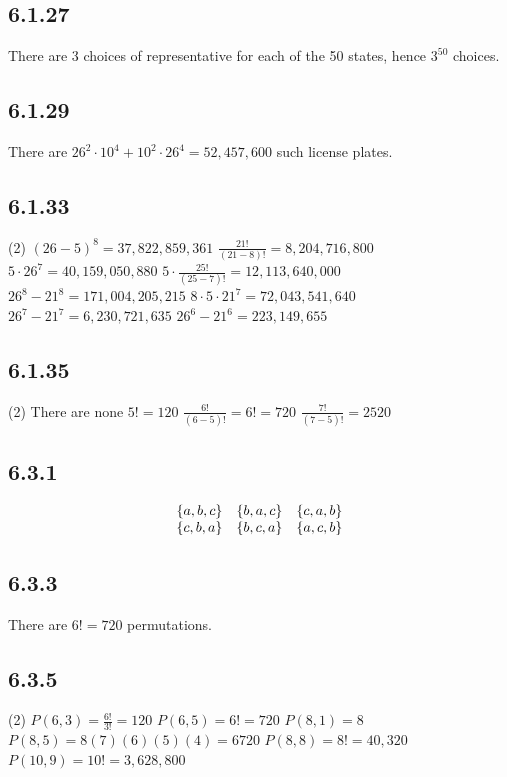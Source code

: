 \documentclass[12pt,titlepage]{extarticle}
\begin{document}
\subsection*{6.1.27}
There are 3 choices of representative for each of the 50 states, hence $3^{50}$ choices.

\subsection*{6.1.29}
There are $26^2 \cdot 10^4 + 10^2 \cdot 26^4 = 52,457,600$ such license plates.

\subsection*{6.1.33}
\begin{tasks}(2)
    \task $(26-5)^8 = 37,822,859,361$
    \task $\frac{21!}{(21-8)!} = 8,204,716,800$
    \task $5 \cdot 26^7 = 40,159,050,880$
    \task $5 \cdot \frac{25!}{(25-7)!} = 12,113,640,000$
    \task $26^8 - 21^8 = 171,004,205,215$
    \task $8 \cdot 5 \cdot 21^7 = 72,043,541,640$
    \task $26^7 - 21^7 = 6,230,721,635$
    \task $26^6 - 21^6 = 223,149,655$
\end{tasks}

\subsection*{6.1.35}
\begin{tasks}(2)
    \task There are none
    \task $5! = 120$
    \task $\frac{6!}{(6-5)!} = 6! = 720$
    \task $\frac{7!}{(7-5)!} = 2520$
\end{tasks}

\subsection*{6.3.1}
\[
    \begin{array}{ccc}
        \qty{a,b,c} & \qty{b,a,c} & \qty{c,a,b} \\
        \qty{c,b,a} & \qty{b,c,a} & \qty{a,c,b}
    \end{array}
\]

\subsection*{6.3.3}
There are $6! = 720$ permutations.

\subsection*{6.3.5}
\begin{tasks}(2)
    \task $P(6,3) = \frac{6!}{3!} = 120$
    \task $P(6,5) = 6! = 720$
    \task $P(8,1) = 8$
    \task $P(8,5) = 8(7)(6)(5)(4) = 6720$
    \task $P(8,8) = 8! = 40,320$
    \task $P(10,9) = 10! = 3,628,800$
\end{tasks}
\end{document}
